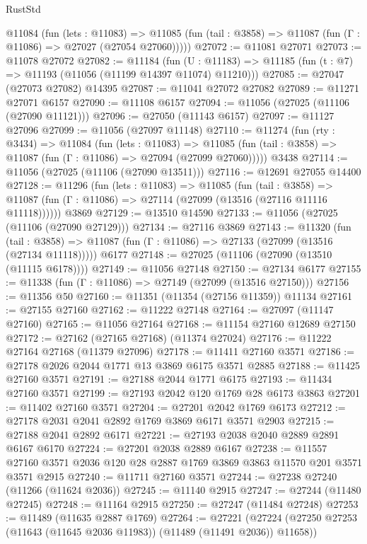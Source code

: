 \begin{lexlean}{RustStd}
\begin{coremodule}
    @11084
      (fun (lets : @11083) =>
      @11085 (fun (tail : @3858) => @11087 (fun (Γ : @11086) => @27027 (@27054 @27060)))))
@27072 := @11081 @27071
@27073 := @11078 @27072
@27082 := @11184
    (fun (U : @11183) => @11185 (fun (t : @7) => @11193 (@11056 (@11199 @14397 @11074) @11210)))
@27085 := @27047 (@27073 @27082) @14395
@27087 := @11041 @27072 @27082
@27089 := @11271 @27071 @6157
@27090 := @11108 @6157
@27094 := @11056 (@27025 (@11106 (@27090 @11121)))
@27096 := @27050 (@11143 @6157)
@27097 := @11127 @27096
@27099 := @11056 (@27097 @11148)
@27110 := @11274
    (fun (rty : @3434) =>
    @11084
      (fun (lets : @11083) =>
      @11085 (fun (tail : @3858) => @11087 (fun (Γ : @11086) => @27094 (@27099 @27060)))))
    @3438
@27114 := @11056 (@27025 (@11106 (@27090 @13511)))
@27116 := @12691 @27055 @14400
@27128 := @11296
    (fun (lets : @11083) =>
    @11085
      (fun (tail : @3858) =>
      @11087 (fun (Γ : @11086) => @27114 (@27099 (@13516 (@27116 @11116 @11118))))))
    @3869
@27129 := @13510 @14590
@27133 := @11056 (@27025 (@11106 (@27090 @27129)))
@27134 := @27116 @3869
@27143 := @11320
    (fun (tail : @3858) => @11087 (fun (Γ : @11086) => @27133 (@27099 (@13516 (@27134 @11118)))))
    @6177
@27148 := @27025 (@11106 (@27090 (@13510 (@11115 @6178))))
@27149 := @11056 @27148
@27150 := @27134 @6177
@27155 := @11338 (fun (Γ : @11086) => @27149 (@27099 (@13516 @27150)))
@27156 := @11356 @50
@27160 := @11351 (@11354 (@27156 @11359)) @11134
@27161 := @27155 @27160
@27162 := @11222 @27148
@27164 := @27097 (@11147 @27160)
@27165 := @11056 @27164
@27168 := @11154 @27160 @12689 @27150
@27172 := @27162 (@27165 @27168) (@11374 @27024)
@27176 := @11222 @27164 @27168 (@11379 @27096)
@27178 := @11411 @27160 @3571
@27186 := @27178 @2026 @2044 @1771 @13 @3869 @6175 @3571 @2885
@27188 := @11425 @27160 @3571
@27191 := @27188 @2044 @1771 @6175
@27193 := @11434 @27160 @3571
@27199 := @27193 @2042 @120 @1769 @28 @6173 @3863
@27201 := @11402 @27160 @3571
@27204 := @27201 @2042 @1769 @6173
@27212 := @27178 @2031 @2041 @2892 @1769 @3869 @6171 @3571 @2903
@27215 := @27188 @2041 @2892 @6171
@27221 := @27193 @2038 @2040 @2889 @2891 @6167 @6170
@27224 := @27201 @2038 @2889 @6167
@27238 := @11557 @27160 @3571 @2036 @120 @28 @2887 @1769 @3869 @3863 @11570 @201 @3571 @3571 @2915
@27240 := @11711 @27160 @3571
@27244 := @27238 @27240 (@11266 (@11624 @2036))
@27245 := @11140 @2915
@27247 := @27244 (@11480 @27245)
@27248 := @11164 @2915
@27250 := @27247 (@11484 @27248)
@27253 := @11489 (@11635 @2887 @1769)
@27264 := @27221
    (@27224 (@27250 @27253 (@11643 (@11645 @2036 @11983)) (@11489 (@11491 @2036)) @11658))

\end{coremodule}
\end{lexlean}
